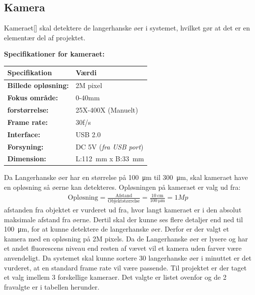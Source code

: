 \newpage
\subsection{Kamera}
\label{subsec:Kamera}
Kameraet[\citet{DH2}] skal detektere de langerhanske øer i systemet, hvilket gør at det er en elementær del af projektet.

\textbf{Specifikationer for kameraet:} 
\begin{center}
		\begin{longtable}{ | m{6.5cm} | m{6.5cm}| } 
			\hline
			\textbf{Specifikation} &\textbf{Værdi} \\ 
			\hline
			\textbf{Billede opløsning:} & 2M pixel \\ 
			\hline
			\textbf{Fokus område:} & 0-40mm  \\ 
			\hline
			\textbf{forstørrelse:} & 25X-400X (Manuelt)  \\ 
			\hline
			\textbf{Frame rate:} & 30f/s  \\ 
			\hline
			\textbf{Interface:} & USB 2.0  \\ 
			\hline
			\textbf{Forsyning:} & DC 5V (\textit{fra USB port})  \\ 
			\hline
			\textbf{Dimension:} & L:\SI{112}{\milli\metre} x B:\SI{33}{\milli\metre}  \\ 
			\hline			
		\end{longtable}
		
	\end{center}
Da Langerhanske øer har en størrelse på \SI{100}{\micro\metre} til \SI{300}{\micro\metre}, skal kameraet have en opløsning så øerne kan detekteres. Opløsningen på kameraet er valg ud fra:
\begin{align}
\text{Opløsning} = \frac{\text{Afstand}}{\text{Objektstørrelse}} = \frac{\SI{10}{\centi\metre}}{\SI{100}{\micro\metre}} =1Mp
\end{align} \citep[s.5]{DH1}
afstanden fra objektet er vurderet ud fra, hvor langt kameraet er i den absolut maksimale afstand fra øerne. Dertil skal der kunne ses flere detaljer end ned til \SI{100}{\micro\metre}, for at kunne detektere de langerhanske øer. Derfor er der valgt et kamera med en opløsning på 2M pixels. Da de Langerhanske øer er lysere og har et andet fluorescens niveau end resten af vævet vil et kamera uden farver være anvendeligt. Da systemet skal kunne sortere 30 langerhanske øer i minuttet er det vurderet, at en standard frame rate vil være passende. Til projektet er der taget et valg imellem 3 forskellige kameraer. Det valgte er listet ovenfor og de 2 fravalgte er i tabellen herunder.

